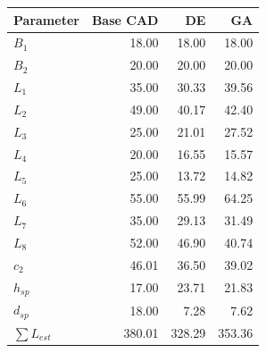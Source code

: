 \begin{tabular}{lrrr}\toprule Parameter & Base CAD & DE & GA\\\midrule
$B_1$ & 18.00 & 18.00 & 18.00\\
$B_2$ & 20.00 & 20.00 & 20.00\\
$L_1$ & 35.00 & 30.33 & 39.56\\
$L_2$ & 49.00 & 40.17 & 42.40\\
$L_3$ & 25.00 & 21.01 & 27.52\\
$L_4$ & 20.00 & 16.55 & 15.57\\
$L_5$ & 25.00 & 13.72 & 14.82\\
$L_6$ & 55.00 & 55.99 & 64.25\\
$L_7$ & 35.00 & 29.13 & 31.49\\
$L_8$ & 52.00 & 46.90 & 40.74\\
$c_2$ & 46.01 & 36.50 & 39.02\\
$h_{sp}$ & 17.00 & 23.71 & 21.83\\
$d_{sp}$ & 18.00 & 7.28 & 7.62\\
\midrule $\sum L_{est}$ & 380.01 & 328.29 & 353.36\\\bottomrule
\end{tabular}